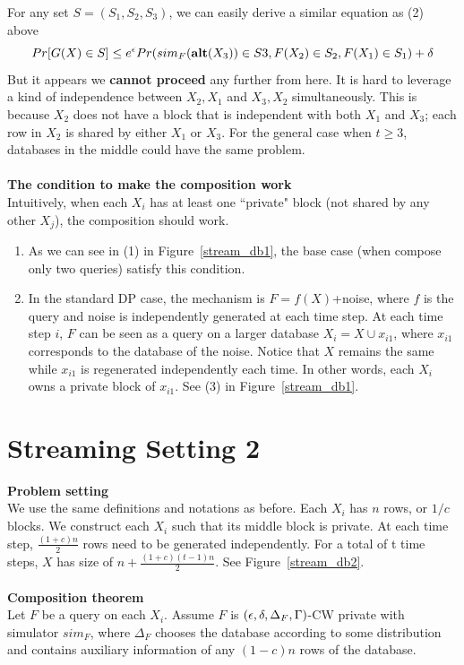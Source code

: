 \documentclass[11pt]{article}
\begin{document}
For any set $S= (S_{1}, S_{2}, S_{3})$, we can easily derive a similar equation as (2) above
\begin{equation}
Pr [G(X) \in S] \leq e^{\epsilon}  Pr({sim_{F}({\bf alt}(X_{3})) \in S{3}}, { F(X_{2}) \in S_{2}}, { F(X_{1}) \in S_{1}})+\delta
\end{equation}
But it appears we {\bf cannot proceed} any further from here. It is hard to leverage a kind of independence between $X_{2}, X_{1}$ and $X_{3}, X_{2}$ simultaneously. This is because $X_{2}$ does not have a block that is independent with both $X_{1}$ and $X_{3}$; each row in $X_{2}$ is shared by either $X_{1}$ or $X_{3}$. For the general case when $t \geq 3$, databases in the middle could have the same problem. 
\\
\\
{\bf The condition to make the composition work}\\
Intuitively, when each $X_{i}$ has at least one ``private" block (not shared by any other $X_{j}$), the composition should work.
\begin{enumerate}
\item As we can see in (1) in Figure~\ref{stream_db1}, the base case (when compose only two queries) satisfy this condition. 
\item In the standard DP case, the mechanism is $F=f(X)$+noise, where $f$ is  the query and noise is independently generated at each time step. At each time step $i$, $F$ can be seen as a query on a larger database $X_{i} = X \cup x_{i1}$, where $x_{i1}$ corresponds to the database of the noise. Notice that $X$ remains the same while $x_{i1}$ is regenerated independently each time. In other words, each $X_{i}$ owns a private block of $x_{i1}$. See (3) in Figure~\ref{stream_db1}.
\end{enumerate}
\section{Streaming Setting 2}
{\bf Problem setting}\\
We use the same definitions and notations as before. Each $X_{i}$ has $n$ rows, or $1/c$ blocks. We construct each $X_{i}$ such that its middle block is private. At each time step, $\frac{(1+c)n}{2}$ rows need to be generated independently. For a total of t time steps, $X$ has size of $n+\frac{(1+c)(t-1)n}{2}$. See Figure~\ref{stream_db2}. 
\\
\\
{\bf Composition theorem}\\
Let $F$ be a query on each $X_{i}$. Assume $F$ is $(\epsilon, \delta, \Delta_{F}, \Gamma)$-CW private with simulator $sim_{F}$, where $\Delta_{F}$ chooses the database according to some distribution and contains auxiliary information of any $(1-c)n$ rows of the database.
\end{document}
